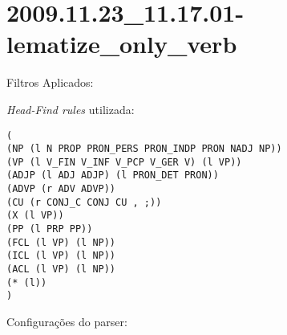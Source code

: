 \section{2009.11.23_11.17.01-lematize_only_verb} %
\label{sec:exp:2009.11.23_11.17.01-lematize_only_verb}

Filtros Aplicados:

\begin{itemize}
  
  \item{\emph{LematizeOnlyVerb}
  
\end{itemize}

\emph{Head-Find rules} utilizada:

\scriptsize
\begin{verbatim}
(
(NP (l N PROP PRON_PERS PRON_INDP PRON NADJ NP))
(VP (l V_FIN V_INF V_PCP V_GER V) (l VP))
(ADJP (l ADJ ADJP) (l PRON_DET PRON))
(ADVP (r ADV ADVP))
(CU (r CONJ_C CONJ CU , ;))
(X (l VP))
(PP (l PRP PP))
(FCL (l VP) (l NP))
(ICL (l VP) (l NP))
(ACL (l VP) (l NP))
(* (l))
)

\end{verbatim}

\normalsize

Configurações do parser:

